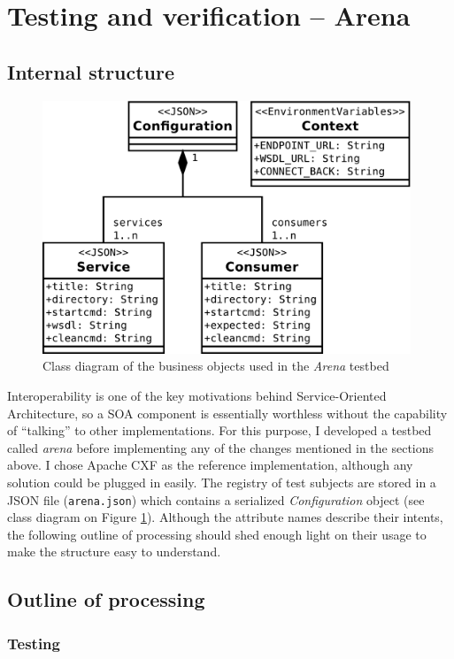 \section{Testing and verification -- Arena}
\label{arena}

\subsection{Internal structure}

\begin{figure}[htbp]
 \centering
 \includegraphics[width=11cm]{images/clsdArena.pdf}
 \caption{Class diagram of the business objects used in the \emph{Arena} testbed}
 \label{fig:clsdArena}
\end{figure}

Interoperability is one of the key motivations behind Service-Oriented Architecture, so a SOA component is essentially worthless without the capability of ``talking'' to other implementations. For this purpose, I developed a testbed called \emph{arena} before implementing any of the changes mentioned in the sections above. I chose Apache CXF as the reference implementation, although any solution could be plugged in easily. The registry of test subjects are stored in a JSON file (\verb|arena.json|) which contains a serialized \emph{Configuration} object (see class diagram on Figure \ref{fig:clsdArena}). Although the attribute names describe their intents, the following outline of processing should shed enough light on their usage to make the structure easy to understand.

\subsection{Outline of processing}

\subsubsection{Testing}
\label{arena_test}

